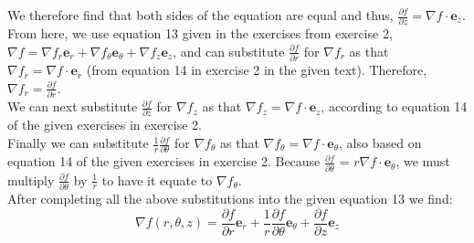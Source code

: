 \documentclass{article}
\begin{document}
We therefore find that both sides of the equation are equal and thus, $\frac{\partial f}{\partial z} =  \nabla f \cdot \mathbf{e}_z$.
\\
From here, we use equation 13 given in the exercises from exercise 2, $\nabla f=\nabla f_{r} \mathbf{e}_{r}+\nabla f_{\theta}\mathbf{e}_{\theta}+\nabla f_{z} \mathbf{e}_{z}$, and can substitute $\frac{\partial f}{\partial r}$ for $\nabla f_r$ as that $ \nabla f_r =\nabla f\cdot \mathbf{e}_{r}$ (from equation 14 in exercise 2 in the given text). Therefore, $\nabla f_{r}=\frac{\partial f}{\partial r}$.
\\
We can next substitute $\frac{\partial f}{\partial z}$ for $\nabla f_z$ as that $ \nabla f_z =\nabla f\cdot \mathbf{e}_{z}$, according to equation 14 of the given exercises in exercise 2.
\\
Finally we can substitute $\frac{1}{r}\frac{\partial f}{\partial \theta}$ for $\nabla f_{\theta}$ as that $\nabla f_{\theta}=\nabla f\cdot \mathbf{e}_{\theta}$, also based on equation 14 of the given exercises in exercise 2. Because $\frac{\partial f}{\partial \theta}$ = $r\nabla f\cdot \mathbf{e}_{\theta}$, we must multiply $\frac{\partial f}{\partial \theta}$ by $\frac{1}{r}$ to have it equate to $\nabla f_{\theta}$. 
\\ 
After completing all the above substitutions into the given equation 13 we find:
\begin{equation}
    \nabla f\left(r,\theta,z\right)=\frac{\partial f}{\partial r}\mathbf{e}_{r}+\frac{1}{r}\frac{\partial f}{\partial\theta}\mathbf{e}_{\theta}+\frac{\partial f}{\partial z}\mathbf{e}_{z}
\end{equation}
\end{document}
